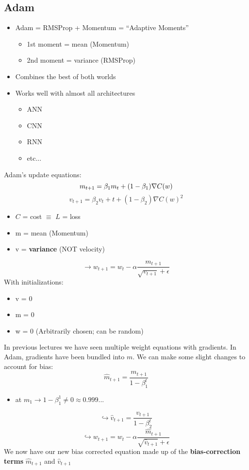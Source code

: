 \subsection{Adam}
\begin{itemize}
    \item Adam = RMSProp + Momentum = ``Adaptive Moments''
    \begin{itemize}
        \item 1st moment = mean (Momentum)
        \item 2nd moment = variance (RMSProp)
    \end{itemize}
    \item Combines the best of both worlds
    \item Works well with almost all architectures
    \begin{itemize}
        \item ANN
        \item CNN
        \item RNN
        \item etc...
    \end{itemize}
\end{itemize}

Adam's update equations:
\[
m_{t+1} = \beta_1 m_t + (1-\beta_1)\nabla C(w) \\
\]
\[
v_{t+1} = \beta_2 v_t+t + (1-\beta_2) \nabla C(w)^2
\]
\begin{itemize}
    \item $C$ = cost $\equiv$ $L$ = loss
    \item m = mean (Momentum)
    \item v = \textbf{variance} (NOT velocity)
\end{itemize}
\[\longrightarrow
w_{t+1} = w_t - \alpha \frac{m_{t+1}}{\sqrt{v_{t+1}}+\epsilon}
\]
With initializations:
\begin{itemize}
    \item v = 0
    \item m = 0
    \item w = 0 (Arbitrarily chosen; can be random)
\end{itemize}
In previous lectures we have seen multiple weight equations with gradients. In Adam, gradients have been bundled into $m$.
\newline
\newline
We can make some slight changes to account for bias:
\[
\hat{m}_{t+1} = \frac{m_{t+1}}{1-\beta_1^t}
\]
\begin{itemize}
    \item at $m_1 \rightarrow 1-\beta_1^1 \neq 0 \approx 0.999...$
\end{itemize}
\[
\hookrightarrow
\hat{v}_{t+1} = \frac{v_{t+1}}{1-\beta_2^t}
\]
\[
\hookrightarrow \boxed{
w_{t+1} = w_t - \alpha \frac{\hat{m}_{t+1}}{\sqrt{\hat{v}_{t+1}}+\epsilon}}
\]
We now have our new bias corrected equation made up of the \textbf{bias-correction terms} $\hat{m}_{t+1}$ and $\hat{v}_{t+1}$
